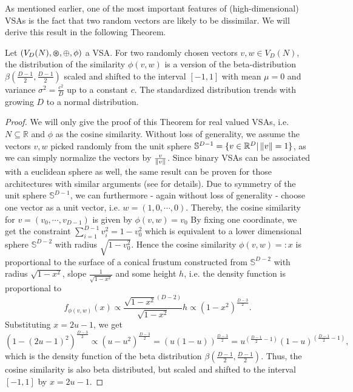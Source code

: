 As mentioned earlier, one of the most important features of (high-dimensional) \acp{VSA} is the fact that two random vectors are likely to be dissimilar.
We will derive this result in the following Theorem.
\begin{theorem}
	\label{theorem:VSA_cossim_distribution}
	Let $\left(V_{D}(N), \varoast, \oplus, \phi \right)$ a \acl{VSA}.
	For two randomly chosen vectors $v, w \in V_{D}(N)$, the distribution of the similarity $\phi\left(v,w\right)$ is a version of the beta-distribution $\beta\left(\frac{D-1}{2},\frac{D-1}{2}\right)$ scaled and shifted to the interval $\left[-1,1\right]$ with mean $\mu=0$ and variance $\sigma^2=\frac{c^2}{D}$ up to a constant $c$. The standardized distribution trends with growing $D$ to a normal distribution.
\end{theorem}
\begin{proof}
	We will only give the proof of this Theorem for real valued \acp{VSA}, i.e. $N \subseteq \mathbb{R}$ and $\phi$ as the cosine similarity.
	Without loss of generality, we assume the vectors $v,w$ picked randomly from the unit sphere $\mathbb{S}^{D-1} = \{ v \in \mathbb{R}^{D} | \left\| v \right\| = 1 \}$, as we can simply normalize the vectors by $\frac{v}{\left\| v \right\|}$.
	Since binary \acp{VSA} can be associated with a euclidean sphere as well, the same result can be proven for those architectures with similar arguments (see \cite{Kanerva1988} for details).
	Due to symmetry of the unit sphere $\mathbb{S}^{D-1}$, we can furthermore - again without loss of generality - choose one vector as a unit vector, i.e. $w=\left(1, 0 , \cdots, 0\right)$.
	Thereby, the cosine similarity for $v=\left(v_{0}, \cdots, v_{D-1}\right)$ is given by $\phi\left(v,w\right) = v_{0}$
	By fixing one coordinate, we get the constraint $\sum_{i=1}^{D-1} v_{i}^{2} = 1-v_{0}^{2}$ which is equivalent to a lower dimensional sphere $\mathbb{S}^{D-2}$ with radius $\sqrt{1-v_{0}^2}$.
	Hence the cosine similarity $\phi\left(v,w\right)=:x$ is proportional to the surface of a conical frustum constructed from $\mathbb{S}^{D-2}$ with radius $\sqrt{1-x^{2}}$, slope $\frac{1}{\sqrt{1-x^{2}}}$ and some height $h$, i.e. the density function is proportional to
	\[
	f_{\phi(v,w)}(x) \propto \frac{\sqrt{1-x^{2}}^{(D-2)}}{\sqrt{1-x^{2}}} h \propto \left(1-x^{2}\right)^{\frac{D-3}{2}}.
	\]
	Substituting $x=2u-1$, we get
	\[
	\left(1-\left(2u-1\right)^{2}\right)^{\frac{D-3}{2}} \propto \left(u-u^2\right)^{\frac{D-3}{2}} = \left(u \left(1-u\right)\right)^{\frac{D-3}{2}} = u^{\left(\frac{D-1}{2}-1\right)} \left(1-u\right)^{\left(\frac{D-1}{2}-1\right)},
	\]
	which is the density function of the beta distribution $\beta\left(\frac{D-1}{2},\frac{D-1}{2}\right)$.
	Thus, the cosine similarity is also beta distributed, but scaled and shifted to the interval $\left[-1,1\right]$ by $x=2u-1$.
    

\end{proof}
